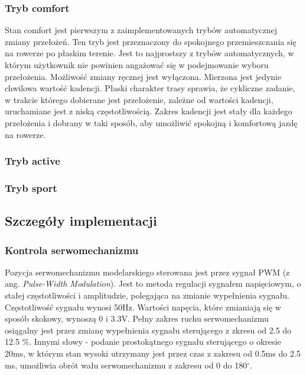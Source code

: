 \subsubsection{Tryb comfort}
Stan comfort jest pierwszym z zaimplementowanych trybów automatycznej zmiany przełożeń. Ten tryb jest przeznaczony do spokojnego przemieszczania się na rowerze po płaskim terenie. Jest to najprostszy z trybów automatycznych, w którym użytkownik nie powinien angażować się w podejmowanie wyboru przełożenia. Możliwość zmiany ręcznej jest wyłączona. Mierzona jest jedynie chwilowa wartość kadencji. Płaski charakter trasy sprawia, że cykliczne zadanie, w trakcie którego dobierane jest przełożenie, zależne od wartości kadencji, uruchamiane jest z niską częstotliwością. Zakres kadencji jest stały dla każdego przełożenia i dobrany w taki sposób, aby umożliwić spokojną i komfortową jazdę na rowerze.  

\subsubsection{Tryb active}


\subsubsection{Tryb sport}  
 

\subsection{Szczegóły implementacji}
\subsubsection{Kontrola serwomechanizmu}
Pozycja serwomechanizmu modelarskiego sterowana jest przez sygnał PWM (z ang. {\em Pulse-Width Modulation}). Jest to metoda regulacji sygnałem napięciowym, o stałej częstotliwości i amplitudzie, polegająca na zmianie wypełnienia sygnału. Częstotliwość sygnału wynosi 50Hz. Wartości napęcia, które zmianiają się w sposób skokowy, wynoszą 0 i 3.3V. Pełny zakres ruchu serwomechanizmu osiągalny jest przez zmianę wypełnienia sygnału sterującego z zkresu od 2.5 do 12.5 \%. Innymi słowy - podanie prostokątnego sygnału sterującego o okresie 20ms, w którym stan wysoki utrzymany jest przez czas z zakresu od 0.5ms do 2.5 ms, umożliwia obrót wału serwomechanizmu z zakresu od 0 do 180$^{\circ}$.

